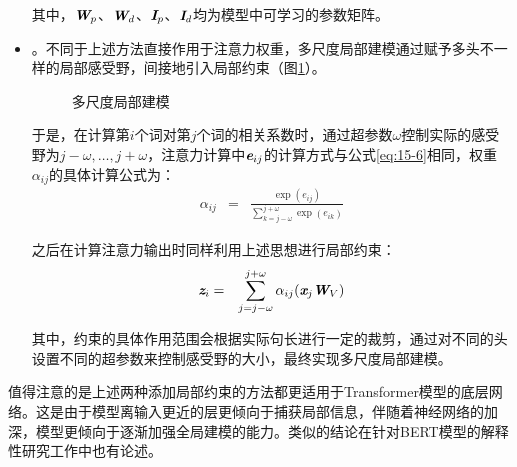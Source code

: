 \begin{itemize}
\noindent 其中，$\textbf{\em W}_p$、$\textbf{\em W}_d$、$\textbf{\em I}_p$、$\textbf{\em I}_d$均为模型中可学习的参数矩阵。

\vspace{0.5em}
\item {\small{}}。不同于上述方法直接作用于注意力权重，多尺度局部建模通过赋予多头不一样的局部感受野，间接地引入局部约束（图\ref{fig:15-4}）。

\begin{figure}[htp]
\centering

\caption{多尺度局部建模}
\label{fig:15-4}
\end{figure}

\noindent 于是，在计算第$i$个词对第$j$个词的相关系数时，通过超参数$\omega$控制实际的感受野为$j-\omega,\ldots,j+\omega$，注意力计算中$\textbf{\em e}_{ij}$的计算方式与公式\eqref{eq:15-6}相同，权重$\alpha_{ij}$的具体计算公式为：
\begin{eqnarray}
\alpha_{ij} &=& \frac{\exp (e_{ij})}{\sum_{k=j-\omega}^{j+\omega}\exp (e_{ik})}
\label{eq:15-20}
\end{eqnarray}

\noindent 之后在计算注意力输出时同样利用上述思想进行局部约束：
\begin{eqnarray}
\textbf{\em z}_{i} &=& \sum_{j=j-\omega}^{j+\omega} \alpha_{ij}(\textbf{\em x}_j \textbf{\em W}_V)
\label{eq:15-22}
\end{eqnarray}

\noindent 其中，约束的具体作用范围会根据实际句长进行一定的裁剪，通过对不同的头设置不同的超参数来控制感受野的大小，最终实现多尺度局部建模。

\vspace{0.5em}
\end{itemize}

\parinterval 值得注意的是上述两种添加局部约束的方法都更适用于Transformer模型的底层网络。这是由于模型离输入更近的层更倾向于捕获局部信息，伴随着神经网络的加深，模型更倾向于逐渐加强全局建模的能力。类似的结论在针对BERT模型的解释性研究工作中也有论述。


